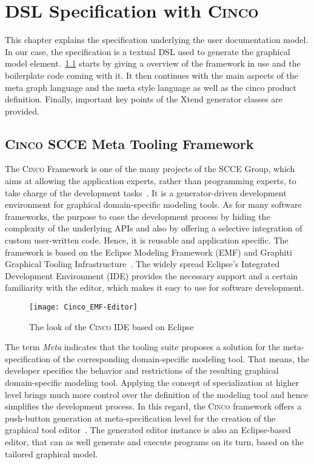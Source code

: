 
\chapter{DSL Specification with \textsc{Cinco}}\label{ch:DSL}

This chapter explains the specification underlying the user documentation model.  In our case, the specification is a textual DSL used to generate the graphical model element.~\ref{sec:CTF} starts by giving a overview of the framework in use and the boilerplate code coming with it. It then continues with the main aspects of the meta graph language and the meta style language as well as the cinco product definition. Finally, important key points of the Xtend generator classes are provided.

\section{\textsc{Cinco} SCCE Meta Tooling Framework}\label{sec:CTF}

The \textsc{Cinco} Framework is one of the many projects of the SCCE Group, which aims at allowing the application experts, rather than programming experts, to take charge of the development tasks~\cite{scce}. It is a generator-driven development environment for graphical domain-specific modeling tools. As for many software frameworks, the purpose to ease the development process by hiding the complexity of the underlying APIs and also by offering a selective integration of custom user-written code. Hence, it is reusable and application specific. The framework is based on the Eclipse Modeling Framework (EMF) and Graphiti Graphical Tooling Infrastructure~\cite{Cinco}. The widely spread Eclipse's Integrated Development Environment (IDE) provides the necessary support and a certain familiarity with the editor, which makes it easy to use for software development.
\begin{figure}[h]
    \centering
    \texttt{[image: Cinco\_EMF-Editor]}
    \caption{The look of the \textsc{Cinco} IDE based on Eclipse}
\end{figure}

The term \textit{Meta} indicates that the tooling suite proposes a solution for the meta-specification of the corresponding domain-specific modeling tool. That means, the developer specifies the behavior and restrictions of the resulting graphical domain-specific modeling tool. Applying the concept of specialization at higher level brings much more control over the definition of the modeling tool and hence simplifies the development process. In this regard, the \textsc{Cinco} framework offers a push-button generation at meta-specification level for the creation of the graphical tool editor~\cite{scce}. The generated editor instance is also an Eclipse-based editor, that can as well generate and execute programs on its turn, based on the tailored graphical model.

